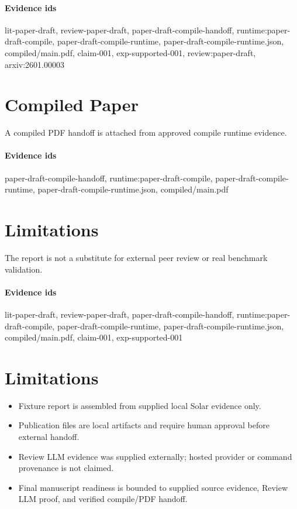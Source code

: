 \documentclass{article}
\begin{document}
\paragraph{Evidence ids} lit-paper-draft, review-paper-draft, paper-draft-compile-handoff, runtime:paper-draft-compile, paper-draft-compile-runtime, paper-draft-compile-runtime.json, compiled/main.pdf, claim-001, exp-supported-001, review:paper-draft, arxiv:2601.00003

\section{Compiled Paper}
A compiled PDF handoff is attached from approved compile runtime evidence.

\paragraph{Evidence ids} paper-draft-compile-handoff, runtime:paper-draft-compile, paper-draft-compile-runtime, paper-draft-compile-runtime.json, compiled/main.pdf

\section{Limitations}
The report is not a substitute for external peer review or real benchmark validation.

\paragraph{Evidence ids} lit-paper-draft, review-paper-draft, paper-draft-compile-handoff, runtime:paper-draft-compile, paper-draft-compile-runtime, paper-draft-compile-runtime.json, compiled/main.pdf, claim-001, exp-supported-001

\section{Limitations}

\begin{itemize}\item Fixture report is assembled from supplied local Solar evidence only.\end{itemize}
\begin{itemize}\item Publication files are local artifacts and require human approval before external handoff.\end{itemize}
\begin{itemize}\item Review LLM evidence was supplied externally; hosted provider or command provenance is not claimed.\end{itemize}
\begin{itemize}\item Final manuscript readiness is bounded to supplied source evidence, Review LLM proof, and verified compile/PDF handoff.\end{itemize}
\end{document}
